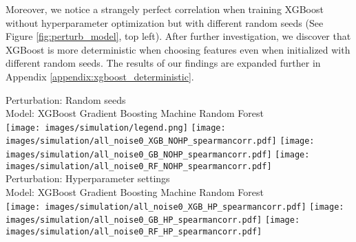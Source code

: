 Moreover, we notice a strangely perfect correlation when training XGBoost without hyperparameter optimization but with different random seeds (See Figure \ref{fig:perturb_model}, top left). After further investigation, we discover that XGBoost is more deterministic when choosing features even when initialized with different random seeds. The results of our findings are expanded further in Appendix \ref{appendix:xgboost_deterministic}.  

 \begin{figure*}[h]
 \centering
 \scriptsize
 Perturbation: Random seeds \\
 Model: \hspace{1cm} XGBoost \hspace{1.5cm} Gradient Boosting Machine \hspace{0.7cm} Random Forest \\ 
  \texttt{[image: images/simulation/legend.png]}
 \texttt{[image: images/simulation/all\_noise0\_XGB\_NOHP\_spearmancorr.pdf]}
 \texttt{[image: images/simulation/all\_noise0\_GB\_NOHP\_spearmancorr.pdf]}
 \texttt{[image: images/simulation/all\_noise0\_RF\_NOHP\_spearmancorr.pdf]} \\
 
 Perturbation: Hyperparameter settings\\
 Model: \hspace{1cm} XGBoost \hspace{1.5cm} Gradient Boosting Machine \hspace{0.7cm} Random Forest \\ 
 \hspace*{10ex}
 \texttt{[image: images/simulation/all\_noise0\_XGB\_HP\_spearmancorr.pdf]}
 \texttt{[image: images/simulation/all\_noise0\_GB\_HP\_spearmancorr.pdf]}
 \texttt{[image: images/simulation/all\_noise0\_RF\_HP\_spearmancorr.pdf]} \\
  \caption{Correlation of feature importances (Blue: gain, Orange: SHAP) for models trained on synthetic data with model perturbations across different number of features.}%
  \label{fig:perturb_model}
\end{figure*}


